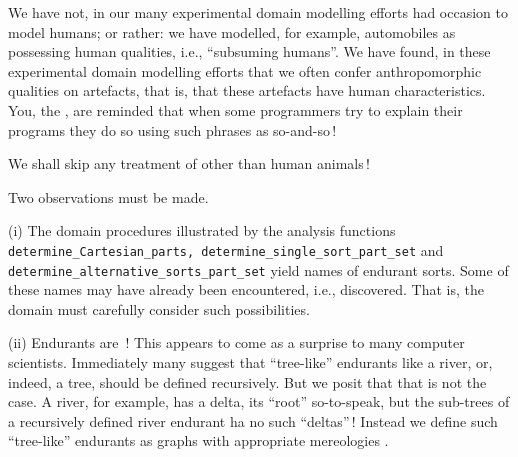 \begynd
\pind We have not, \nyl in our many experimental domain modelling efforts
\begynd
\pind had occasion to model humans;
\pind or rather:
\begynd
\pind we have modelled, for example, automobiles
\begynd
\pind as possessing human qualities, 
\pind i.e., ``subsuming humans''.
\afslut
\afslut
\afslut
\mnewfoil
\pind We have found, \nyl  in these experimental domain modelling efforts
\begynd
\pind that we often confer anthropomorphic qualities on artefacts, 
\pind that is, that these artefacts have human characteristics.
\afslut
\pind You, the , are reminded
\begynd
\pind that when some programmers try to explain their programs
\pind they do so using such phrases as
\pind {} so-and-so\,!
\afslut
\afslut

\label{sec:Other}

\begynd
\pind We shall skip any treatment of other than human animals\,!
\afslut
\label{chapter1-phy-liv.n}

\treprikker

\noindent
{}

\label{Some Observations}

\begynd
\pind Two observations must be made.
 
\begynd
\pind (i) The domain  procedures
\begynd
\pind illustrated by
      the analysis functions
\pind  \texttt{de\-term\-ine\_\-Car\-te\-si\-an\_\-parts,
\pind 
      de\-term\-ine\_\-single\_\-sort\_\-part\_set} and
\pind 
      \texttt{de\-term\-ine\_\-al\-tern\-a\-tive\_\-sorts\_\-part\_\-set}
\pind  yield names of
      endurant sorts.
\pind  Some of these names may have already been
      encountered, i.e., discovered.
\pind  That is, the domain  must
      carefully consider such possibilities.
\afslut
      
\mnewfoil

\pind (ii) Endurants are \,! 
\begynd
\pind This appears to come as a surprise \nyl to many computer scientists.
\pind Immediately many suggest that ``tree-like'' endurants  \nyl like a river,
\pind or, indeed, a tree, 
\pind should be defined recursively.
\pind But we posit that that is not the case.
\pind A river, for example, has a delta, its ``root'' so-to-speak,
\pind but the sub-trees of a recursively defined river endurant
\pind ha no such ``deltas''\,! 
\pind Instead we define such
      ``tree-like'' endurants \nyl  as graphs with appropriate
      mereologies .
\afslut
\afslut
\afslut

